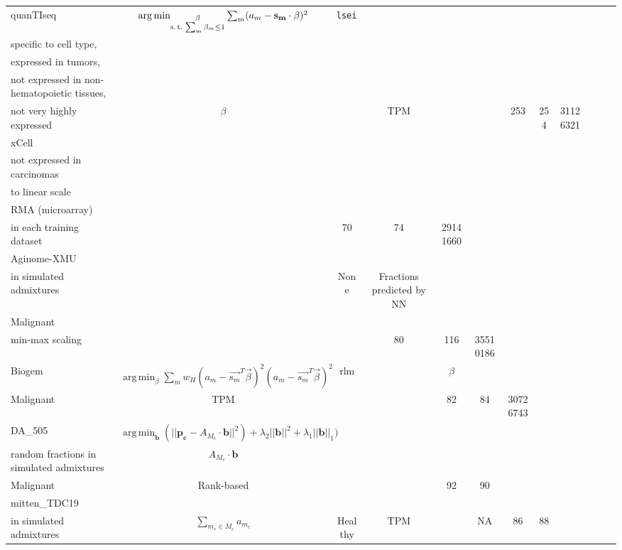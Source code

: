 \documentclass[border=3mm,preview]{standalone}
\DeclareMathOperator*{\argmin}{arg\,min}
\newcommand{\mybf}{\fontseries{b}\selectfont} %
\begin{document}
\begin{threeparttable}
\begin{tabular}{lccccccccccc}
    \mybf quanTIseq &
    $
    \argmin_{
      \substack{
        \mathbf{\beta} \\
        \text{s.\,t.}\, \sum_m \beta_m \le 1
      }
    } \sum_m (a_m - \mathbf{s_m} \cdot \mathbf{\beta})^2 $
    & \tt{lsei} & \makecell{Correlated with random fractions in simulated admixtures,\\specific to cell type,\\expressed in tumors,\\not expressed in non-hematopoietic tissues,\\not very highly expressed} & $\beta$ & & TPM & & & 253 & 254 & 31126321 \\
    \mybf xCell & & & \makecell{DE’ed, specific to cell type,\\not expressed in carcinomas}& \makecell{ssGSEA mapped\\to linear scale} & & \makecell{FPKM (RNA-seq),\\RMA (microarray)} & \makecell{Markers determined independently\\in each training dataset} & & 70 & 74 & 29141660 \\
\hline    
    \mybf Aginome-XMU & \makecell{DNN trained to predict random fractions\\in simulated admixtures} & & None & Fractions predicted by NN & \makecell{Healthy,\\Malignant} & \makecell{TPM,log,\\min-max scaling}& & & 80 & 116 & 35510186 \\
    \mybf Biogem & $\argmin_\beta \sum_m w_H(a_m - \vec{s_m}^T \vec{\beta})^2 (a_m - \vec{s_m}^T \vec{\beta})^2$ & rlm & & $\beta$ & \makecell{Healthy,\\Malignant}& TPM & & & 82 & 84 & 30726743 \\
    \mybf DA\_505 & $\argmin_\mathbf{b} (||\mathbf{p_c} - A_{M_c} \cdot \mathbf{b}||^2) + \lambda_2||\mathbf{b}||^2 + \lambda_1 ||\mathbf{b}||_1) $ & & \makecell{Identified by RF regression against\\random fractions in simulated admixtures} & $A_{M_c} \cdot \mathbf{b}$ & \makecell{Healthy,\\Malignant} & Rank-based & & & 92 & 90 & \\
    \mybf mitten\_TDC19 & & & \makecell{Correlated with random fractions\\in simulated admixtures} & $\sum_{m_c \in M_c} a_{m_c}$ & Healthy & TPM & & NA & 86 & 88 & \\             
    \midrule
\end{tabular}
\caption*{$|e|_\epsilon \equiv 0 \text{if } |e| < \epsilon; |e| - \epsilon \text{otherwise}$ \\
$w_H(e) \equiv 1 \text{if } |e| < k;  k/|e| \text{otherwise}$}

\end{threeparttable}
\end{document}
